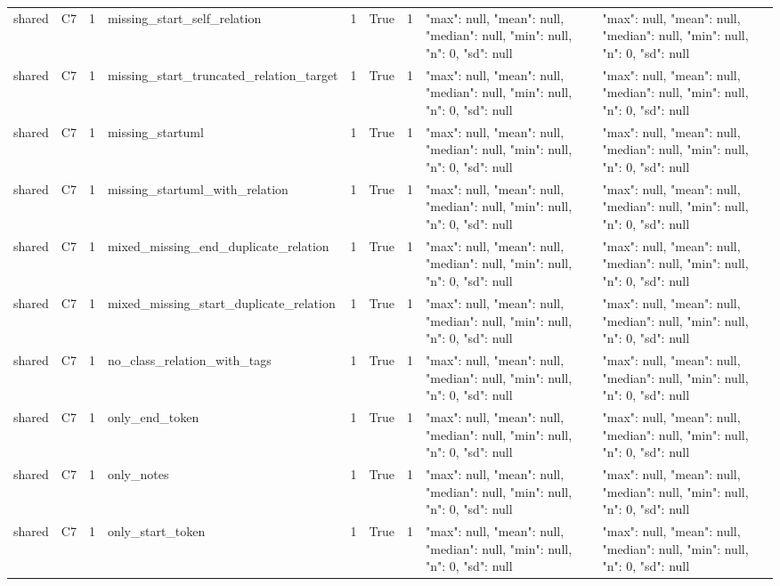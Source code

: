 \begin{tabular}{lllllllll}
shared & C7 & 1 & missing\_start\_self\_relation & 1 & True & 1 & {"max": null, "mean": null, "median": null, "min": null, "n": 0, "sd": null} & {"max": null, "mean": null, "median": null, "min": null, "n": 0, "sd": null} \\
shared & C7 & 1 & missing\_start\_truncated\_relation\_target & 1 & True & 1 & {"max": null, "mean": null, "median": null, "min": null, "n": 0, "sd": null} & {"max": null, "mean": null, "median": null, "min": null, "n": 0, "sd": null} \\
shared & C7 & 1 & missing\_startuml & 1 & True & 1 & {"max": null, "mean": null, "median": null, "min": null, "n": 0, "sd": null} & {"max": null, "mean": null, "median": null, "min": null, "n": 0, "sd": null} \\
shared & C7 & 1 & missing\_startuml\_with\_relation & 1 & True & 1 & {"max": null, "mean": null, "median": null, "min": null, "n": 0, "sd": null} & {"max": null, "mean": null, "median": null, "min": null, "n": 0, "sd": null} \\
shared & C7 & 1 & mixed\_missing\_end\_duplicate\_relation & 1 & True & 1 & {"max": null, "mean": null, "median": null, "min": null, "n": 0, "sd": null} & {"max": null, "mean": null, "median": null, "min": null, "n": 0, "sd": null} \\
shared & C7 & 1 & mixed\_missing\_start\_duplicate\_relation & 1 & True & 1 & {"max": null, "mean": null, "median": null, "min": null, "n": 0, "sd": null} & {"max": null, "mean": null, "median": null, "min": null, "n": 0, "sd": null} \\
shared & C7 & 1 & no\_class\_relation\_with\_tags & 1 & True & 1 & {"max": null, "mean": null, "median": null, "min": null, "n": 0, "sd": null} & {"max": null, "mean": null, "median": null, "min": null, "n": 0, "sd": null} \\
shared & C7 & 1 & only\_end\_token & 1 & True & 1 & {"max": null, "mean": null, "median": null, "min": null, "n": 0, "sd": null} & {"max": null, "mean": null, "median": null, "min": null, "n": 0, "sd": null} \\
shared & C7 & 1 & only\_notes & 1 & True & 1 & {"max": null, "mean": null, "median": null, "min": null, "n": 0, "sd": null} & {"max": null, "mean": null, "median": null, "min": null, "n": 0, "sd": null} \\
shared & C7 & 1 & only\_start\_token & 1 & True & 1 & {"max": null, "mean": null, "median": null, "min": null, "n": 0, "sd": null} & {"max": null, "mean": null, "median": null, "min": null, "n": 0, "sd": null} \\

\end{tabular}
